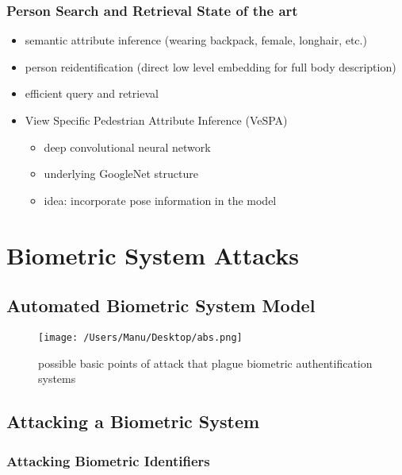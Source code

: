 \documentclass[paper=a4, fontsize=11pt]{scrartcl} %
\numberwithin{equation}{section} %
\numberwithin{figure}{section} %
\numberwithin{table}{section} %
\begin{document}
\subsubsection{Person Search and Retrieval State of the art}

\begin{itemize}
\item semantic attribute inference (wearing backpack, female, longhair, etc.)
\item person reidentification (direct low level embedding for full body description)
\item efficient query and retrieval
\item View Specific Pedestrian Attribute Inference (VeSPA)
\begin{itemize}
\item deep convolutional neural network
\item underlying GoogleNet structure
\item idea: incorporate pose information in the model
\end{itemize}
\end{itemize}

\section{Biometric System Attacks}

\subsection{Automated Biometric System Model}

\begin{figure}[ht]
\texttt{[image: /Users/Manu/Desktop/abs.png]}
\caption{possible basic points of attack that plague biometric authentification systems}
\end{figure}

\subsection{Attacking a Biometric System}

\subsubsection{Attacking Biometric Identifiers}
\end{document}
